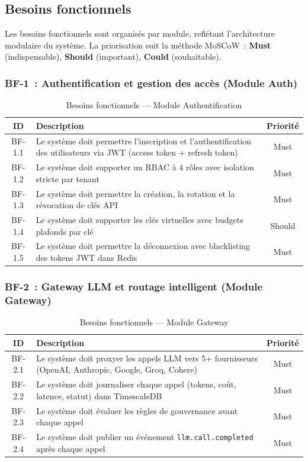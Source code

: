\subsection{Besoins fonctionnels}

Les besoins fonctionnels sont organisés par module, reflétant l'architecture modulaire du système. La priorisation suit la méthode MoSCoW~: \textbf{Must} (indispensable), \textbf{Should} (important), \textbf{Could} (souhaitable).

\subsubsection{BF-1~: Authentification et gestion des accès (Module Auth)}

\begin{table}[H]
\centering
\caption{Besoins fonctionnels --- Module Authentification}
\label{tab:bf_auth}
\begin{tabularx}{\textwidth}{|c|X|c|}
\hline
\textbf{ID} & \textbf{Description} & \textbf{Priorité} \\
\hline
BF-1.1 & Le système doit permettre l'inscription et l'authentification des utilisateurs via JWT (access token + refresh token) & Must \\
\hline
BF-1.2 & Le système doit supporter un RBAC à 4 rôles avec isolation stricte par tenant & Must \\
\hline
BF-1.3 & Le système doit permettre la création, la rotation et la révocation de clés API & Must \\
\hline
BF-1.4 & Le système doit supporter les clés virtuelles avec budgets plafonds par clé & Should \\
\hline
BF-1.5 & Le système doit permettre la déconnexion avec blacklisting des tokens JWT dans Redis & Must \\
\hline
\end{tabularx}
\end{table}

\subsubsection{BF-2~: Gateway LLM et routage intelligent (Module Gateway)}

\begin{table}[H]
\centering
\caption{Besoins fonctionnels --- Module Gateway}
\label{tab:bf_gateway}
\begin{tabularx}{\textwidth}{|c|X|c|}
\hline
\textbf{ID} & \textbf{Description} & \textbf{Priorité} \\
\hline
BF-2.1 & Le système doit proxyer les appels LLM vers 5+ fournisseurs (OpenAI, Anthropic, Google, Groq, Cohere) & Must \\
\hline
BF-2.2 & Le système doit journaliser chaque appel (tokens, coût, latence, statut) dans TimescaleDB & Must \\
\hline
BF-2.3 & Le système doit évaluer les règles de gouvernance avant chaque appel & Must \\
\hline
BF-2.4 & Le système doit publier un événement \texttt{llm.call.completed} après chaque appel & Must \\
\hline
\end{tabularx}
\end{table}

